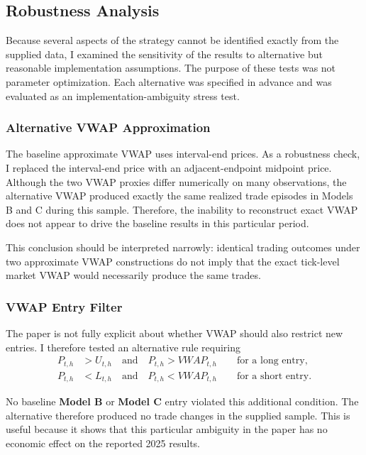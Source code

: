 \documentclass{article}
\begin{document}
\subsection{Robustness Analysis}

Because several aspects of the strategy cannot be identified exactly from the supplied data, I examined the sensitivity of the results to alternative but reasonable implementation assumptions. The purpose of these tests was not parameter optimization. Each alternative was specified in advance and was evaluated as an implementation-ambiguity stress test.

\subsubsection{Alternative VWAP Approximation}

The baseline approximate VWAP uses interval-end prices. As a robustness check, I replaced the interval-end price with an adjacent-endpoint midpoint price. Although the two VWAP proxies differ numerically on many observations, the alternative VWAP produced exactly the same realized trade episodes in Models B and C during this sample. Therefore, the inability to reconstruct exact VWAP does not appear to drive the baseline results in this particular period.

This conclusion should be interpreted narrowly: identical trading outcomes under two approximate VWAP constructions do not imply that the exact tick-level market VWAP would necessarily produce the same trades.

\subsubsection{VWAP Entry Filter}

The paper is not fully explicit about whether VWAP should also restrict new entries. I therefore tested an alternative rule requiring
\begin{align}
    P_{t,h} &> U_{t,h}
    \quad\text{and}\quad
    P_{t,h} > VWAP_{t,h}
    \qquad \text{for a long entry},\\
    P_{t,h} &< L_{t,h}
    \quad\text{and}\quad
    P_{t,h} < VWAP_{t,h}
    \qquad \text{for a short entry}.
\end{align}

No baseline\textbf{ Model B} or\textbf{ Model C} entry violated this additional condition. The alternative therefore produced no trade changes in the supplied sample. This is useful because it shows that this particular ambiguity in the paper has no economic effect on the reported 2025 results.
\end{document}
